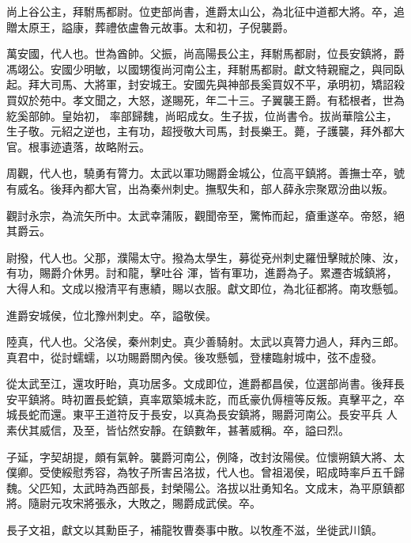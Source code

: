 \begin{pinyinscope}
 尚上谷公主，拜駙馬都尉。位吏部尚書，進爵太山公，為北征中道都大將。卒，追贈太原王，謚康，葬禮依盧魯元故事。太和初，子倪襲爵。



 萬安國，代人也。世為酋帥。父振，尚高陽長公主，拜駙馬都尉，位長安鎮將，爵馮翊公。安國少明敏，以國甥復尚河南公主，拜駙馬都尉。獻文特親寵之，與同臥起。拜大司馬、大將軍，封安城王。安國先與神部長奚買奴不平，承明初，矯詔殺買奴於苑中。孝文聞之，大怒，遂賜死，年二十三。子翼襲王爵。有嵇根者，世為紇奚部帥。皇始初，
 率部歸魏，尚昭成女。生子拔，位尚書令。拔尚華陰公主，生子敬。元紹之逆也，主有功，超授敬大司馬，封長樂王。薨，子護襲，拜外都大官。根事迹遺落，故略附云。



 周觀，代人也，驍勇有膂力。太武以軍功賜爵金城公，位高平鎮將。善撫士卒，號有威名。後拜內都大官，出為秦州刺史。撫馭失和，部人薛永宗聚眾汾曲以叛。



 觀討永宗，為流矢所中。太武幸蒲阪，觀聞帝至，驚怖而起，瘡重遂卒。帝怒，絕其爵云。



 尉撥，代人也。父那，濮陽太守。撥為太學生，募從兗州刺史羅忸擊賊於陳、汝，有功，賜爵介休男。討和龍，擊吐谷
 渾，皆有軍功，進爵為子。累遷杏城鎮將，大得人和。文成以撥清平有惠績，賜以衣服。獻文即位，為北征都將。南攻懸瓠。



 進爵安城侯，位北豫州刺史。卒，謚敬侯。



 陸真，代人也。父洛侯，秦州刺史。真少善騎射。太武以真膂力過人，拜內三郎。真君中，從討蠕蠕，以功賜爵關內侯。後攻懸瓠，登樓臨射城中，弦不虛發。



 從太武至江，還攻盱眙，真功居多。文成即位，進爵都昌侯，位選部尚書。後拜長安平鎮將。時初置長蛇鎮，真率眾築城未訖，而氐豪仇傉檀等反叛。真擊平之，卒城長蛇而還。東平王道符反于長安，以真為長安鎮將，賜爵河南公。長安平兵
 人素伏其威信，及至，皆怗然安靜。在鎮數年，甚著威稱。卒，謚曰烈。



 子延，字契胡提，頗有氣幹。襲爵河南公，例降，改封汝陽侯。位懷朔鎮大將、太僕卿。受使綏慰秀容，為牧子所害呂洛拔，代人也。曾祖渴侯，昭成時率戶五千歸魏。父匹知，太武時為西部長，封榮陽公。洛拔以壯勇知名。文成末，為平原鎮都將。隨尉元攻宋將張永，大敗之，賜爵成武侯。卒。



 長子文祖，獻文以其勳臣子，補龍牧曹奏事中散。以牧產不滋，坐徙武川鎮。




\end{pinyinscope}
